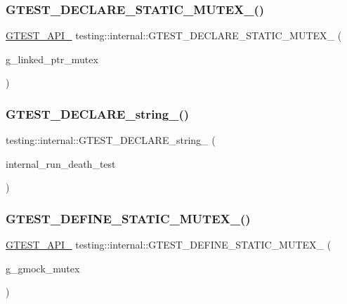 \subsubsection{\texorpdfstring{GTEST\_DECLARE\_STATIC\_MUTEX\_()}{GTEST\_DECLARE\_STATIC\_MUTEX\_()}}
{\footnotesize\ttfamily \mbox{\hyperlink{gtest-port_8h_aa73be6f0ba4a7456180a94904ce17790}{G\+T\+E\+S\+T\+\_\+\+A\+P\+I\+\_\+}} testing\+::internal\+::\+G\+T\+E\+S\+T\+\_\+\+D\+E\+C\+L\+A\+R\+E\+\_\+\+S\+T\+A\+T\+I\+C\+\_\+\+M\+U\+T\+E\+X\+\_\+ (\begin{DoxyParamCaption}\item[{g\+\_\+linked\+\_\+ptr\+\_\+mutex}]{ }\end{DoxyParamCaption})}

\mbox{\label{namespacetesting_1_1internal_ac20f635c3285878fc1195ce687f23950}} 
\subsubsection{\texorpdfstring{GTEST\_DECLARE\_string\_()}{GTEST\_DECLARE\_string\_()}}
{\footnotesize\ttfamily testing\+::internal\+::\+G\+T\+E\+S\+T\+\_\+\+D\+E\+C\+L\+A\+R\+E\+\_\+string\+\_\+ (\begin{DoxyParamCaption}\item[{internal\+\_\+run\+\_\+death\+\_\+test}]{ }\end{DoxyParamCaption})}

\mbox{\label{namespacetesting_1_1internal_a8c4aa7be8daa7b60e293071d70a89584}} 
\subsubsection{\texorpdfstring{GTEST\_DEFINE\_STATIC\_MUTEX\_()}{GTEST\_DEFINE\_STATIC\_MUTEX\_()}\hspace{0.1cm}{\footnotesize\ttfamily [1/3]}}
{\footnotesize\ttfamily \mbox{\hyperlink{gtest-port_8h_aa73be6f0ba4a7456180a94904ce17790}{G\+T\+E\+S\+T\+\_\+\+A\+P\+I\+\_\+}} testing\+::internal\+::\+G\+T\+E\+S\+T\+\_\+\+D\+E\+F\+I\+N\+E\+\_\+\+S\+T\+A\+T\+I\+C\+\_\+\+M\+U\+T\+E\+X\+\_\+ (\begin{DoxyParamCaption}\item[{g\+\_\+gmock\+\_\+mutex}]{ }\end{DoxyParamCaption})}

